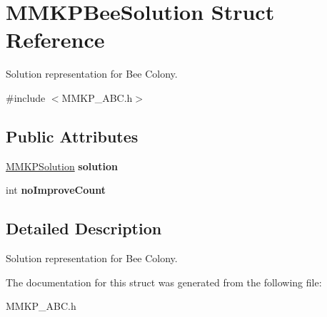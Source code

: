 \hypertarget{struct_m_m_k_p_bee_solution}{\section{M\+M\+K\+P\+Bee\+Solution Struct Reference}
\label{struct_m_m_k_p_bee_solution}
}


Solution representation for Bee Colony.  




{\ttfamily \#include $<$M\+M\+K\+P\+\_\+\+A\+B\+C.\+h$>$}

\subsection*{Public Attributes}
\begin{DoxyCompactItemize}
\item 
\hypertarget{struct_m_m_k_p_bee_solution_a6424a02862496caedb1a865116d70b15}{\hyperlink{class_m_m_k_p_solution}{M\+M\+K\+P\+Solution} {\bfseries solution}}\label{struct_m_m_k_p_bee_solution_a6424a02862496caedb1a865116d70b15}

\item 
\hypertarget{struct_m_m_k_p_bee_solution_a1fa2e1b8c830b6e0f989a4a59d41bd20}{int {\bfseries no\+Improve\+Count}}\label{struct_m_m_k_p_bee_solution_a1fa2e1b8c830b6e0f989a4a59d41bd20}

\end{DoxyCompactItemize}


\subsection{Detailed Description}
Solution representation for Bee Colony. 

The documentation for this struct was generated from the following file\+:\begin{DoxyCompactItemize}
\item 
M\+M\+K\+P\+\_\+\+A\+B\+C.\+h\end{DoxyCompactItemize}
